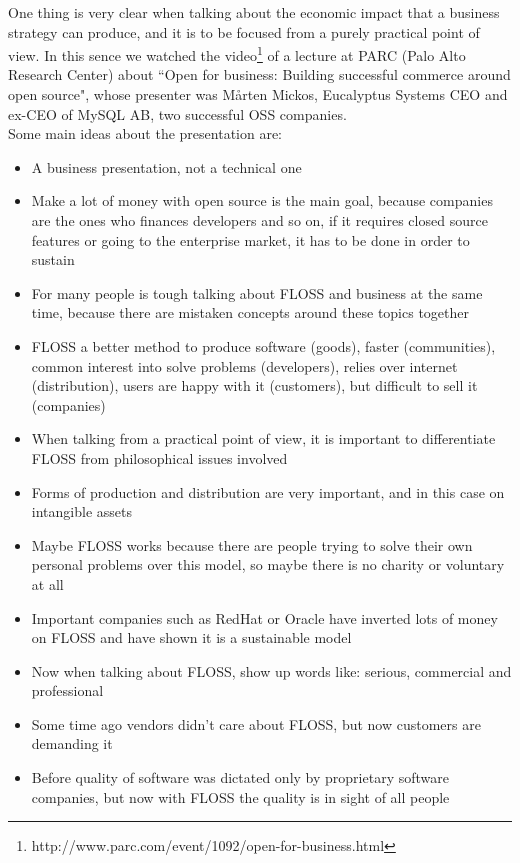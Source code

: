 One thing is very clear when talking about the economic impact that a business strategy can produce, and it is to be focused from a purely practical point of view. In this sence we watched the video\footnote{http://www.parc.com/event/1092/open-for-business.html} of a lecture at PARC (Palo Alto Research Center) about \textquotedblleft Open for business: Building successful commerce around open source", whose presenter was M\aa rten Mickos, Eucalyptus Systems CEO and ex-CEO of MySQL AB, two successful OSS companies.\\

Some main ideas about the presentation are:

\begin{itemize}
\item A business presentation, not a technical one
\item Make a lot of money with open source is the main goal, because companies are the ones who finances developers and so on, if it requires closed source features or going to the enterprise market, it has to be done in order to sustain
\item For many people is tough talking about FLOSS and business at the same time, because there are mistaken concepts around these topics together
\item FLOSS a better method to produce software (goods), faster (communities), common interest into solve problems (developers), relies over internet (distribution), users are happy with it (customers), but difficult to sell it (companies)
\item When talking from a practical point of view, it is important to differentiate FLOSS from philosophical issues involved
\item Forms of production and distribution are very important, and in this case on intangible assets
\item Maybe FLOSS works because there are people trying to solve their own personal problems over this model, so maybe there is no charity or voluntary at all
\item Important companies such as RedHat or Oracle have inverted lots of money on FLOSS and have shown it is a sustainable model
\item Now when talking about FLOSS, show up words like: serious, commercial and professional
\item Some time ago vendors didn't care about FLOSS, but now customers are demanding it
\item Before quality of software was dictated only by proprietary software companies, but now with FLOSS the quality is in sight of all people

\end{itemize}
